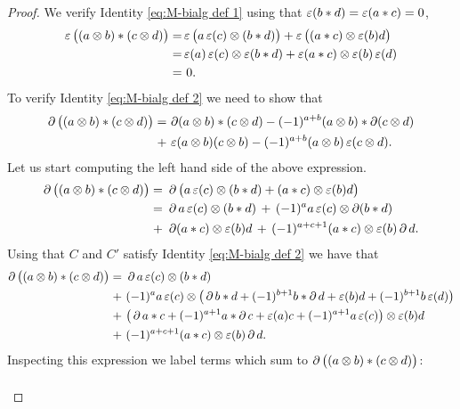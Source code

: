 \begin{proof}
	We verify Identity \eqref{eq:M-bialg def 1} using that $\aug(b \ast d) = \aug(a \ast c) = 0$,
	\begin{align*}
		\aug\big((a \ot b) \ast (c \ot d)\big) =&
		\aug\big(a \aug(c) \ot (b \ast d)\big) + \aug\big((a \ast c) \ot \aug(b) d\big) \\ =&
		\aug(a) \aug(c) \ot \aug(b \ast d) + \aug(a \ast c) \ot \aug(b) \aug(d) \\ =& \ 0.
	\end{align*}
	To verify Identity \eqref{eq:M-bialg def 2} we need to show that
	\begin{equation}\label{eq:monoidal appendix}
		\begin{split}
			\bd \big((a \ot b) \ast (c \ot d)\big) =\, &
			\bd (a \ot b) \ast (c \ot d) - (-1)^{a+b} (a \ot b) \ast \bd (c \ot d) \\ +\, &
			\aug(a \ot b) (c \ot b) - (-1)^{a+b} (a \ot b) \aug(c \ot d).
		\end{split}
	\end{equation}
	Let us start computing the left hand side of the above expression.
	\begin{align*}
		\bd\big((a \ot b) \ast (c \ot d)\big) =\ &
		\bd\big(a \aug(c) \ot (b \ast d) + (a \ast c) \ot \aug(b) d\big) \\ =\ &
		\bd a \aug(c) \ot (b \ast d) \,+\, (-1)^{a} a \aug(c) \ot \bd(b \ast d) \\ +\ &
		\bd (a \ast c) \ot \aug(b) d \,+\, (-1)^{a+c+1} (a \ast c) \ot \aug(b) \bd d.
	\end{align*}
	Using that $C$ and $C'$ satisfy Identity \eqref{eq:M-bialg def 2} we have that
	\begin{align*}
		\bd\big((a \ot b) \ast (c \ot d)\big) =\ &
		\bd a \aug(c) \ot (b \ast d) \\ +\ &
		(-1)^a a \aug(c) \ot \big(\bd b \ast d + (-1)^{b+1} b \ast \bd d + \aug(b) d + (-1)^{b+1} b \aug(d)\big) \\ +\ &
		\big(\bd a \ast c + (-1)^{a+1} a \ast \bd c + \aug(a) c + (-1)^{a+1} a \aug(c)\big) \ot \aug(b) d \\ +\ &
		(-1)^{a+c+1} (a \ast c) \ot \aug(b) \bd d.
	\end{align*}
	Inspecting this expression we label terms which sum to $\bd\big((a \ot b) \ast (c \ot d)\big)$:\vspace*{-10pt}
	\begin{minipage}[t]{0.5\textwidth}
		\begin{align}& \label{x4}

\end{align}
\end{minipage}
\end{proof}
